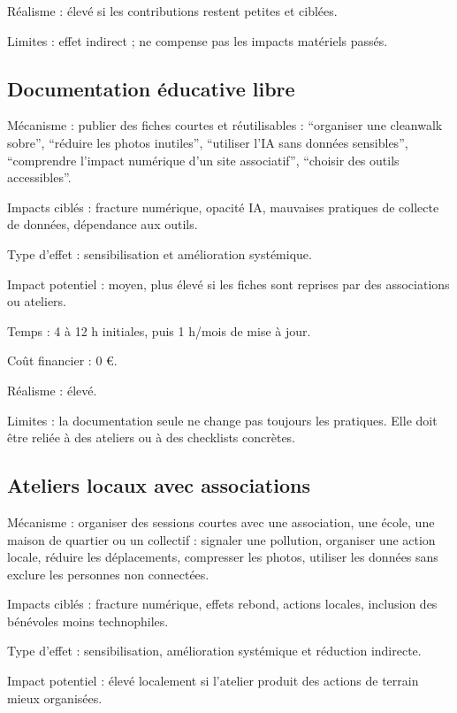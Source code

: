 \documentclass[
  10pt,
  a4paper,
  DIV=11,
  numbers=noendperiod,
  oneside]{scrreprt}
\begin{document}
Réalisme : élevé si les contributions restent petites et ciblées.

Limites : effet indirect ; ne compense pas les impacts matériels passés.

\subsection{Documentation éducative
libre}\label{documentation-uxe9ducative-libre}

Mécanisme : publier des fiches courtes et réutilisables : ``organiser
une cleanwalk sobre'', ``réduire les photos inutiles'', ``utiliser l'IA
sans données sensibles'', ``comprendre l'impact numérique d'un site
associatif'', ``choisir des outils accessibles''.

Impacts ciblés : fracture numérique, opacité IA, mauvaises pratiques de
collecte de données, dépendance aux outils.

Type d'effet : sensibilisation et amélioration systémique.

Impact potentiel : moyen, plus élevé si les fiches sont reprises par des
associations ou ateliers.

Temps : 4 à 12 h initiales, puis 1 h/mois de mise à jour.

Coût financier : 0 €.

Réalisme : élevé.

Limites : la documentation seule ne change pas toujours les pratiques.
Elle doit être reliée à des ateliers ou à des checklists concrètes.

\subsection{Ateliers locaux avec
associations}\label{ateliers-locaux-avec-associations}

Mécanisme : organiser des sessions courtes avec une association, une
école, une maison de quartier ou un collectif : signaler une pollution,
organiser une action locale, réduire les déplacements, compresser les
photos, utiliser les données sans exclure les personnes non connectées.

Impacts ciblés : fracture numérique, effets rebond, actions locales,
inclusion des bénévoles moins technophiles.

Type d'effet : sensibilisation, amélioration systémique et réduction
indirecte.

Impact potentiel : élevé localement si l'atelier produit des actions de
terrain mieux organisées.
\end{document}
